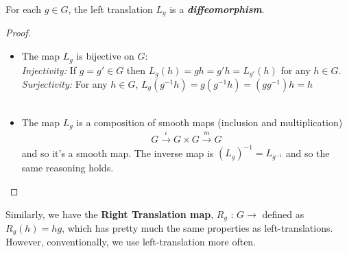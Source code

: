 \documentclass[11pt]{article}
\begin{document}
\begin{redbox}
  \begin{theorem} For each $g \in G$, the left translation $L_g$ is a \textbf{\emph{diffeomorphism}}.
  \end{theorem}
\end{redbox}

\vskip 0.5cm
\begin{dottedbox}
  \begin{proof}
    \begin{itemize}
      \item The map $L_g$ is bijective on $G$:
      \\
      \textit{Injectivity:} If $g = g' \in G$ then $L_{g}(h) = gh = g'h = L_{g'}(h)$ for any $h \in G$.
      \\
      \textit{Surjectivity:} For any $h \in G$, $L_{g}(g^{-1}h) = g\left(g^{-1}h\right) = \left(g g^{-1}\right)h = h$
      \\
      \\
      \item The map $L_g$ is a composition of smooth maps (inclusion and multiplication)
      \begin{align*}
        G \xrightarrow{\iota} G \times G \xrightarrow{m} G
      \end{align*}
      and so it's a smooth map. The inverse map is $\left(L_g\right)^{-1} = L_{g^{-1}}$ and so the same reasoning holds.
    \end{itemize}
  \end{proof}
\end{dottedbox}

\begin{redbox}
  Similarly, we have the \textbf{Right Translation map}, $R_g \text{ : } G \rightarrow$ defined as $R_g(h) = hg$, which has pretty much the same properties as left-translations. However, conventionally, we use left-translation more often.
\end{redbox}

\end{document}

